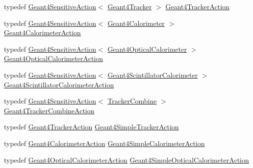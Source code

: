 \begin{DoxyCompactItemize}
\item 
typedef \hyperlink{class_d_d4hep_1_1_simulation_1_1_geant4_sensitive_action}{Geant4\+Sensitive\+Action}$<$ \hyperlink{class_d_d4hep_1_1_simulation_1_1_geant4_tracker}{Geant4\+Tracker} $>$ \hyperlink{namespace_d_d4hep_1_1_simulation_abb17b973f2ae551abf2c7662d5c05e12}{Geant4\+Tracker\+Action}
\item 
typedef \hyperlink{class_d_d4hep_1_1_simulation_1_1_geant4_sensitive_action}{Geant4\+Sensitive\+Action}$<$ \hyperlink{class_d_d4hep_1_1_simulation_1_1_geant4_calorimeter}{Geant4\+Calorimeter} $>$ \hyperlink{namespace_d_d4hep_1_1_simulation_af49169edf9a8a04f3255a2b126698128}{Geant4\+Calorimeter\+Action}
\item 
typedef \hyperlink{class_d_d4hep_1_1_simulation_1_1_geant4_sensitive_action}{Geant4\+Sensitive\+Action}$<$ \hyperlink{struct_d_d4hep_1_1_simulation_1_1_geant4_optical_calorimeter}{Geant4\+Optical\+Calorimeter} $>$ \hyperlink{namespace_d_d4hep_1_1_simulation_a9b4de3b53a0e39ec195ab057b9b3b971}{Geant4\+Optical\+Calorimeter\+Action}
\item 
typedef \hyperlink{class_d_d4hep_1_1_simulation_1_1_geant4_sensitive_action}{Geant4\+Sensitive\+Action}$<$ \hyperlink{struct_d_d4hep_1_1_simulation_1_1_geant4_scintillator_calorimeter}{Geant4\+Scintillator\+Calorimeter} $>$ \hyperlink{namespace_d_d4hep_1_1_simulation_a518721ad629e0c574145b27d7e1e0c36}{Geant4\+Scintillator\+Calorimeter\+Action}
\item 
typedef \hyperlink{class_d_d4hep_1_1_simulation_1_1_geant4_sensitive_action}{Geant4\+Sensitive\+Action}$<$ \hyperlink{struct_d_d4hep_1_1_simulation_1_1_tracker_combine}{Tracker\+Combine} $>$ \hyperlink{namespace_d_d4hep_1_1_simulation_ae4372869044729bc07b6343c4e077fdc}{Geant4\+Tracker\+Combine\+Action}
\item 
typedef \hyperlink{namespace_d_d4hep_1_1_simulation_abb17b973f2ae551abf2c7662d5c05e12}{Geant4\+Tracker\+Action} \hyperlink{namespace_d_d4hep_1_1_simulation_a6f4f8c57d8b3239f579f31519e803afa}{Geant4\+Simple\+Tracker\+Action}
\item 
typedef \hyperlink{namespace_d_d4hep_1_1_simulation_af49169edf9a8a04f3255a2b126698128}{Geant4\+Calorimeter\+Action} \hyperlink{namespace_d_d4hep_1_1_simulation_a567bbed97768b8a89f60e745b6d3dd51}{Geant4\+Simple\+Calorimeter\+Action}
\item 
typedef \hyperlink{namespace_d_d4hep_1_1_simulation_a9b4de3b53a0e39ec195ab057b9b3b971}{Geant4\+Optical\+Calorimeter\+Action} \hyperlink{namespace_d_d4hep_1_1_simulation_a3017d956ee0a02d03e54c12486dd9230}{Geant4\+Simple\+Optical\+Calorimeter\+Action}

\end{DoxyCompactItemize}
